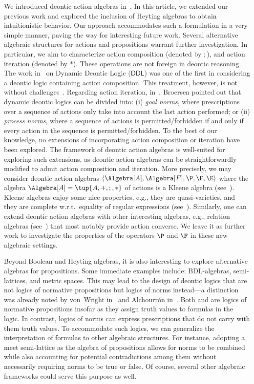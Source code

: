 We introduced deontic action algebras in~\cite{CCFA:2021}. In this article, we extended our previous work and explored the inclusion of Heyting algebras to obtain intuitionistic behavior.
Our approach accommodates such a formulation in a very simple manner, paving the way for interesting future work.
Several alternative algebraic structures for actions and propositions warrant further investigation.
In particular, we aim to characterize action composition (denoted by $;$), and action iteration (denoted by $*$).
These operations are not foreign in deontic reasoning.
The work in~\cite{Meyer:88} on Dynamic Deontic Logic ($\mathsf{DDL}$) was one of the first in considering a deontic logic containing action composition.
This treatment, however, is not without challenges~\cite{Anglberger:08}.
Regarding action iteration, in~\cite{BroersenThesis}, Broersen pointed out that dynamic deontic logics can be divided into: (i) \emph{goal norms}, where prescriptions over a sequence of actions only take into account the last action performed; or (ii) \emph{process norms}, where a sequence of actions is permitted/forbidden if and only if every action in the sequence is permitted/forbidden.
To the best of our knowledge, no extensions of \DAL incorporating action composition or iteration have been explored.
The framework of deontic action algebras is well-suited for exploring such extensions, as deontic action algebras can be straightforwardly modified to admit action composition and iteration.
More precisely, we may consider deontic action algebras $\langle \Algebra[A], \Algebra[F], \P, \F, \E \rangle$ where the algebra $\Algebra[A] = \tup{A, +, ;, *}$ of actions is a Kleene algebra (see~\cite{Kozen:90}).
Kleene algebras enjoy some nice properties, e.g.,
they are quasi-varieties, and they are complete w.r.t.\ equality of regular expressions (see~\cite{Kozen:91}).
Similarly, one can extend deontic action algebras with other interesting algebras, e.g., relation algebras (see~\cite{MadduxBook}) that most notably provide action converse.
We leave it as further work to investigate the properties of the
operators $\P$ and $\F$ in these new algebraic settings.

Beyond Boolean and Heyting algebras, it is also interesting to explore alternative algebras for propositions.
Some immediate examples include: BDL-algebras, semi-lattices, and metric spaces.
This may lead to the design of deontic logics that are not logics of normative propositions but logics of norms instead---a distinction was already noted by von~Wright in~\cite{vonWright:1999} and Alchourr\'on in~\cite{Alchourron:69,Alchourron:1971}.
Both \SDL and \DAL are logics of normative propositions insofar as they assign truth values to formulas in the logic.
In contrast, logics of norms can express prescriptions that do not carry with them truth values.
To accommodate such logics, we can generalize the interpretation of formulas to other algebraic structures.
For instance, adopting a meet semi-lattice as the algebra of propositions allows for norms to be combined while also accounting for potential contradictions among them without necessarily requiring norms to be true or false.
Of course, several other algebraic frameworks could serve this purpose as well.

